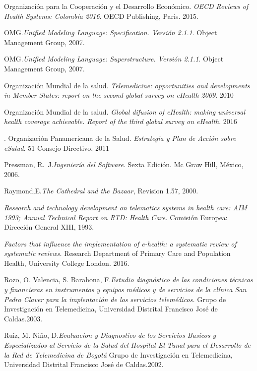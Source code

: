 \begin{thebibliography}{}
 Organización para la Cooperación y el Desarrollo Económico. \textit{OECD Reviews of Health Systems: Colombia 2016}. OECD Publishing, Paris. 2015.

 OMG.\textit{Unified Modeling Language: Specification. Versión 2.1.1}. Object Management Group, 2007.

 OMG.\textit{Unified Modeling Language: Superstructure. Versión 2.1.1}. Object Management Group, 2007.

 Organización Mundial de la salud. \textit{Telemedicine: opportunities and developments in Member States: report on the second global survey on eHealth 2009}. 2010

 Organización Mundial de la salud. \textit{Global difusion of eHealth: making universal health coverage achievable. Report of the third global survey on eHealth}. 2016

. Organización Panamericana de la Salud. \textit{Estrategia y Plan de Acción sobre eSalud}. 51 Consejo Directivo, 2011

 Pressman, R.~J.\textit{Ingeniería del Software}. Sexta Edición. Mc Graw 
Hill, México, 2006.

 Raymond,E.\textit{The Cathedral and the Bazaar}, Revision 1.57, 2000.

 \textit{Research and technology development on telematics systems in health care: AIM 1993; Annual Technical Report on RTD: Health Care.} Comisión Europea: Dirección General XIII, 1993.

 \textit{Factors that influence the implementation of e-health: a systematic review of systematic reviews.} Research Department of Primary Care and Population Health, University College London. 2016.

 Rozo, O. Valencia, S. Barahona, F.\textit{Estudio diagnóstico de las condiciones técnicas y financieras en instrumentos y equipos médicos  y de servicios de la clínica San Pedro Claver para la implentación de los servicios telemédicos.} Grupo de Investigación en Telemedicina,  Universidad Distrital Francisco José de Caldas.2003.

 Ruiz, M. Niño, D.\textit{Evaluacion y Diagnostico de los Servicios Basicos y Especializados al Servicio de la Salud del Hospital El Tunal para el Desarrollo de la Red de Telemedicina de Bogotá} Grupo de Investigación en Telemedicina,  Universidad Distrital Francisco José de Caldas.2002.


\end{thebibliography}
